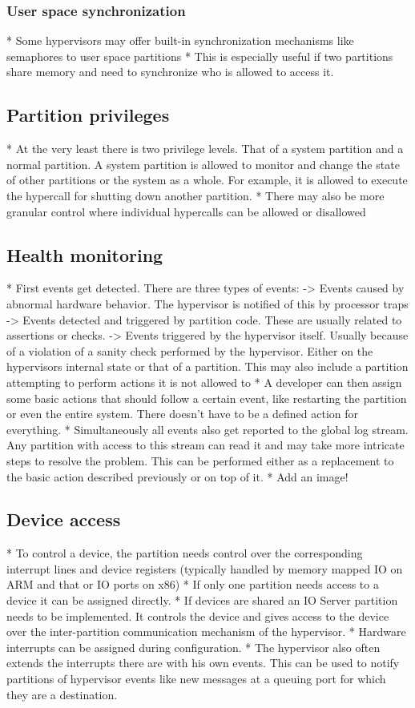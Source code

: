 \subsubsection{User space synchronization}
* Some hypervisors may offer built-in synchronization mechanisms like semaphores to user space partitions
* This is especially useful if two partitions share memory and need to synchronize who is allowed to access it. 
\subsection{Partition privileges}
* At the very least there is two privilege levels. That of a system partition and a normal partition. A system partition is allowed to monitor and change the state of other partitions or the system as a whole. For example, it is allowed to execute the hypercall for shutting down another partition.
* There may also be more granular control where individual hypercalls can be allowed or disallowed
\subsection{Health monitoring}
* First events get detected. There are three types of events:
    -> Events caused by abnormal hardware behavior. The hypervisor is notified of this by processor traps
    -> Events detected and triggered by partition code. These are usually related to assertions or checks.
    -> Events triggered by the hypervisor itself. Usually because of a violation of a sanity check performed by the hypervisor. Either on the hypervisors internal state or that of a partition. This may also include a partition attempting to perform actions it is not allowed to
* A developer can then assign some basic actions that should follow a certain event, like restarting the partition or even the entire system. There doesn't have to be a defined action for everything.
* Simultaneously all events also get reported to the global log stream. Any partition with access to this stream can read it and may take more intricate steps to resolve the problem. This can be performed either as a replacement to the basic action described previously or on top of it.
* Add an image!
\subsection{Device access}
* To control a device, the partition needs control over the corresponding interrupt lines and device registers (typically handled by memory mapped IO on ARM and that or IO ports on x86)
* If only one partition needs access to a device it can be assigned directly.
* If devices are shared an IO Server partition needs to be implemented. It controls the device and gives access to the device over the inter-partition communication mechanism of the hypervisor. 
* Hardware interrupts can be assigned during configuration. 
* The hypervisor also often extends the interrupts there are with his own events. This can be used to notify partitions of hypervisor events like new messages at a queuing port for which they are a destination.
